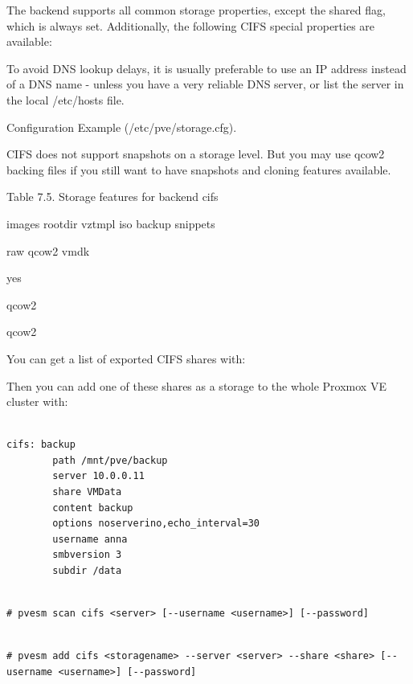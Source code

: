 The backend supports all common storage properties, except the shared flag, which is always set. Additionally, the following CIFS special properties are available:

To avoid DNS lookup delays, it is usually preferable to use an IP address instead of a DNS name - unless you have a very reliable DNS server, or list the server in the local /etc/hosts file.

Configuration Example (/etc/pve/storage.cfg).

CIFS does not support snapshots on a storage level. But you may use qcow2 backing files if you still want to have snapshots and cloning features available.

Table 7.5. Storage features for backend cifs

images rootdir vztmpl iso backup snippets

raw qcow2 vmdk

yes

qcow2

qcow2

You can get a list of exported CIFS shares with:

Then you can add one of these shares as a storage to the whole Proxmox VE cluster with:

\begin{lstlisting}

cifs: backup
        path /mnt/pve/backup
        server 10.0.0.11
        share VMData
        content backup
        options noserverino,echo_interval=30
        username anna
        smbversion 3
        subdir /data

\end{lstlisting}

\begin{lstlisting}

# pvesm scan cifs <server> [--username <username>] [--password]

\end{lstlisting}

\begin{lstlisting}

# pvesm add cifs <storagename> --server <server> --share <share> [--username <username>] [--password]

\end{lstlisting}

\begin{table}[htbp]

\centering

\begin{tabular}

\end{tabular}

\end{table}


